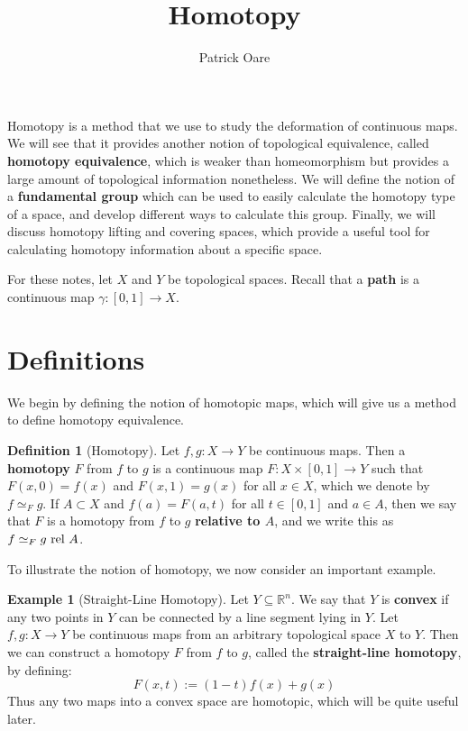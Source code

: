 \documentclass[11pt, oneside]{amsart}   	%
\title{Homotopy}
\author{Patrick Oare}
\date{}							%
\theoremstyle{definition}
\newtheorem{definition}{Definition}[section]
\newtheorem{example}{Example}[section]
\begin{document}
\maketitle

	Homotopy is a method that we use to study the deformation of continuous maps. We will see that it provides another notion of topological equivalence, 
	called \textbf{homotopy equivalence}, which is weaker than homeomorphism but provides a large amount of topological information nonetheless. We will 
	define the notion of a \textbf{fundamental group} which can be used to easily calculate the homotopy type of a space, and develop different ways to calculate 
	this group. Finally, we will discuss homotopy lifting and covering spaces, which provide a useful tool for calculating homotopy information about a specific 
	space.
	
	For these notes, let $X$ and $Y$ be topological spaces. Recall that a \textbf{path} is a continuous map $\gamma : [0, 1]\rightarrow X$. 

\section{Definitions}

	We begin by defining the notion of homotopic maps, which will give us a method to define homotopy equivalence. 
	
	\begin{definition}[Homotopy]
		Let $f, g : X\rightarrow Y$ be continuous maps. Then a \textbf{homotopy} $F$ from $f$ to $g$ is a continuous map $F : X\times [0, 1]\rightarrow Y$ such 
		that $F(x, 0) = f(x)$ and $F(x, 1) = g(x)$ for all $x\in X$, which we denote by $f\simeq_F g$. If $A\subset X$ and $f(a) = F(a, t)$ for all $t\in [0, 1]$ and $a\in 
		A$, then we say that $F$ is a homotopy from $f$ to $g$ \textbf{relative to $A$}, and we write this as $f\simeq_F g\textnormal{ rel }A$.
	\end{definition}
	
	To illustrate the notion of homotopy, we now consider an important example.
	
	\begin{example}[Straight-Line Homotopy]
	
		Let $Y\subseteq\mathbb R^n$. We say that $Y$ is \textbf{convex} if any two points in $Y$ can be connected by a line segment lying in $Y$. Let $f, g : 
		X\rightarrow Y$ be continuous maps from an arbitrary topological space $X$ to $Y$. Then we can construct a homotopy $F$ from $f$ to $g$, called 
		the \textbf{straight-line homotopy}, by defining:
		$$
			F(x, t) := (1 - t)f(x) + g(x)
		$$
		Thus any two maps into a convex space are homotopic, which will be quite useful later.
	
	\end{example}
	
\end{document}
